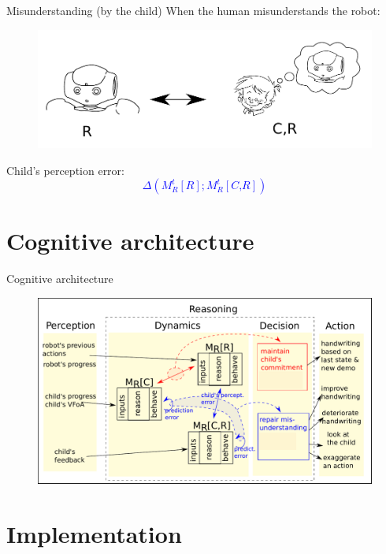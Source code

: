 \documentclass[compress]{beamer}
\begin{document}
\begin{frame}{Misunderstanding (by the child)}
When the human misunderstands the robot:
\centering
\begin{figure}
\includegraphics[width=0.9\columnwidth]{true_mis2}
\end{figure}

Child's perception error:
\huge
\textcolor{blue}{$$\Delta \left( M^t_R\left[\textit{R}\right] ; M^t_R\left[\textit{C,R}\right]\right)$$}
\end{frame}


\section*{Cognitive architecture}

\begin{frame}{Cognitive architecture}
\centering
\begin{figure}
\includegraphics[width=1.\columnwidth]{final_archi2}
\end{figure}
\end{frame}

\section*{Implementation}
\end{document}
